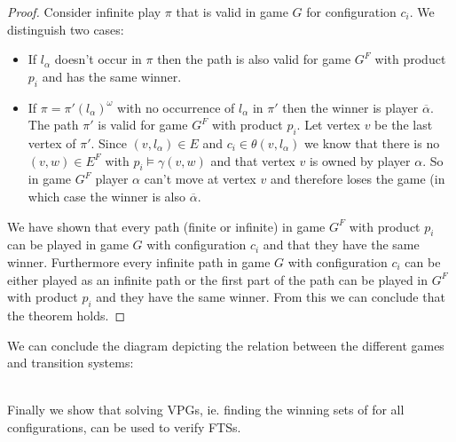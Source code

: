 \begin{theorem}
\begin{proof}
		Consider infinite play $\pi$ that is valid in game $G$ for configuration $c_i$. We distinguish two cases:
		\begin{itemize}
			\item If $l_\alpha$ doesn't occur in $\pi$ then the path is also valid for game $G^F$ with product $p_i$ and has the same winner.
			\item If $\pi = \pi'(l_\alpha)^\omega$ with no occurrence of $l_\alpha$ in $\pi'$ then the winner is player $\overline{\alpha}$. The path $\pi'$ is valid for game $G^F$ with product $p_i$. Let vertex $v$ be the last vertex of $\pi'$. Since $(v, l_\alpha) \in E$ and $c_i \in \theta(v,l_\alpha)$ we know that there is no $(v,w) \in E^F$ with $p_i \models \gamma(v,w)$ and that vertex $v$ is owned by player $\alpha$. So in game $G^F$ player $\alpha$ can't move at vertex $v$ and therefore loses the game (in which case the winner is also $\overline{\alpha}$.
		\end{itemize}
		
		We have shown that every path (finite or infinite) in game $G^F$ with product $p_i$ can be played in game $G$ with configuration $c_i$ and that they have the same winner. Furthermore every infinite path in game $G$ with configuration $c_i$ can be either played as an infinite path or the first part of the path can be played in $G^F$ with product $p_i$ and they have the same winner. From this we can conclude that the theorem holds.
	\end{proof}
\end{theorem}
We can conclude the diagram depicting the relation between the different games and transition systems:\\
\\
Finally we show that solving VPGs, ie. finding the winning sets of for all configurations, can be used to verify FTSs.
